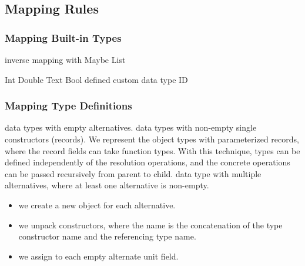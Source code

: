 
\subsection{Mapping Rules}

\begin{frame}\frametitle{Mapping Built-in Types}
\begin{itemize}
  \begin{itemize}
     inverse mapping with Maybe
     List
  \end{itemize}
  \begin{itemize}
     Int
     Double
     Text
     Bool
      defined custom data type ID 
  \end{itemize}
\end{itemize}
\end{frame}

\begin{frame}\frametitle{Mapping Type Definitions}

\begin{itemize}
   data types with empty alternatives.
   data types with non-empty single constructors (records). 
   We represent the object types with parameterized records, where the record fields can take function types. With this technique, types can be defined independently of the resolution operations, and the concrete operations can be passed recursively from parent to child. 
   data type with multiple alternatives, where at least one alternative is non-empty.
  \begin{itemize}
    \item we create a new object for each alternative.
    \item we unpack constructors, where the name is the concatenation of the type constructor name and the referencing type name. 
    \item we assign to each empty alternate unit field.
  \end{itemize}
\end{itemize}

\end{frame}

  




